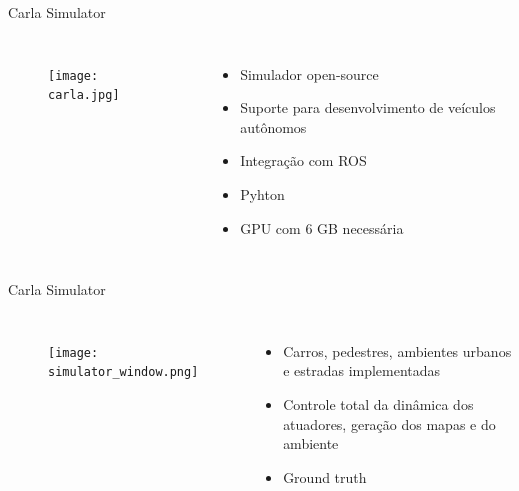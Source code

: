 \begin{frame}[t]{Carla Simulator} 
        \begin{columns}[t]
                \begin{figure}
                    \texttt{[image: carla.jpg]}
                \end{figure}
                \vspace*{0.8cm}
                \large{
                \begin{itemize}
                    \item Simulador open-source
                    \item Suporte para desenvolvimento de veículos autônomos
                    \item Integração com ROS
                    \item Pyhton
                    \item GPU com 6 GB necessária
                \end{itemize}
                }
        \end{columns}
\end{frame}
\begin{frame}[t]{Carla Simulator} 
    \begin{columns}[t]
            \begin{figure}
                \texttt{[image: simulator\_window.png]}
            \end{figure}
            \vspace*{0.8cm}
            \large{
            \begin{itemize}
                \item Carros, pedestres, ambientes urbanos e estradas implementadas
                \item Controle total da dinâmica dos atuadores, geração dos mapas e do ambiente
                \item Ground truth 
            \end{itemize}
            }
    \end{columns}
\end{frame}
